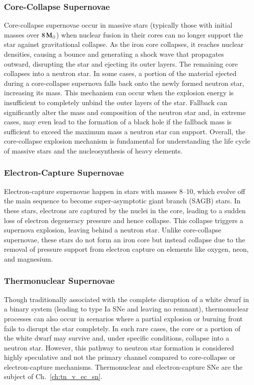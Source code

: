 \documentclass[main.tex]{subfiles}
\begin{document}
    \subsubsection{Core-Collapse Supernovae}
    Core-collapse supernovae occur in massive stars (typically those with initial masses over $8\mathrm{\,M_\odot}$) when nuclear fusion in their cores can no longer support the star against gravitational collapse. As the iron core collapses, it reaches nuclear densities, causing a bounce and generating a shock wave that propagates outward, disrupting the star and ejecting its outer layers. The remaining core collapses into a neutron star. In some cases, a portion of the material ejected during a core-collapse supernova falls back onto the newly formed neutron star, increasing its mass. This mechanism can occur when the explosion energy is insufficient to completely unbind the outer layers of the star. Fallback can significantly alter the mass and composition of the neutron star and, in extreme cases, may even lead to the formation of a black hole if the fallback mass is sufficient to exceed the maximum mass a neutron star can support. Overall, the core-collapse explosion mechanism is fundamental for understanding the life cycle of massive stars and the nucleosynthesis of heavy elements.
    \subsubsection{Electron-Capture Supernovae}
    Electron-capture supernovae happen in stars with masses \numrange{8}{10}\msun, which evolve off the main sequence to become super-asymptotic giant branch (SAGB) stars. In these stars, electrons are captured by the nuclei in the core, leading to a sudden loss of electron degeneracy pressure and hence collapse. This collapse triggers a supernova explosion, leaving behind a neutron star. Unlike core-collapse supernovae, these stars do not form an iron core but instead collapse due to the removal of pressure support from electron capture on elements like oxygen, neon, and magnesium.
    \subsubsection{Thermonuclear Supernovae}
    Though traditionally associated with the complete disruption of a white dwarf in a binary system (leading to type Ia SNe and leaving no remnant), thermonuclear processes can also occur in scenarios where a partial explosion or burning front fails to disrupt the star completely. In such rare cases, the core or a portion of the white dwarf may survive and, under specific conditions, collapse into a neutron star. However, this pathway to neutron star formation is considered highly speculative and not the primary channel compared to core-collapse or electron-capture mechanisms. Thermonuclear and electron-capture SNe are the subject of Ch.~\ref{ch:tn_v_ec_sn}.
\end{document}
